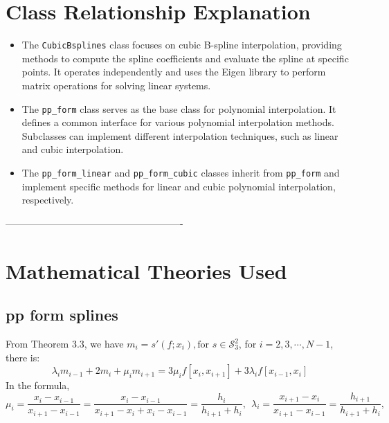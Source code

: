 \documentclass[a4paper]{article}
\begin{document}
\section{Class Relationship Explanation}

\begin{itemize}
    \item The \texttt{CubicBsplines} class focuses on cubic B-spline interpolation, providing methods to compute the spline coefficients and evaluate the spline at specific points. It operates independently and uses the Eigen library to perform matrix operations for solving linear systems.
    \item The \texttt{pp\_form} class serves as the base class for polynomial interpolation. It defines a common interface for various polynomial interpolation methods. Subclasses can implement different interpolation techniques, such as linear and cubic interpolation.
    \item The \texttt{pp\_form\_linear} and \texttt{pp\_form\_cubic} classes inherit from \texttt{pp\_form} and implement specific methods for linear and cubic polynomial interpolation, respectively.
\end{itemize}

-------------------------------------------------------

\section*{Mathematical Theories Used}
\subsection{pp form splines}

From Theorem 3.3, we have $m_i = s'(f;x_i), \text{for } s \in \mathcal{S}_3^2$, for $i=2,3,\cdots,N-1$, there is:
\begin{equation}
    \lambda_i m_{i-1} +2m_i +\mu_i m_{i+1} = 3\mu_i f[x_i,x_{i+1}]+3\lambda_if[x_{i-1},x_i]
\end{equation}
In the formula,
\begin{equation}
    \mu_i = \frac{x_i-x_{i-1}}{x_{i+1}-x_{i-1}}=\frac{x_i-x_{i-1}}{x_{i+1}-x_{i}+x_i-x_{i-1}} = \frac{h_i}{h_{i+1}+h_i}, \ \ \lambda_i = \frac{x_{i+1}-x_{i}}{x_{i+1}-x_{i-1}} = \frac{h_{i+1}}{h_{i+1}+h_i},
\end{equation}
\end{document}

